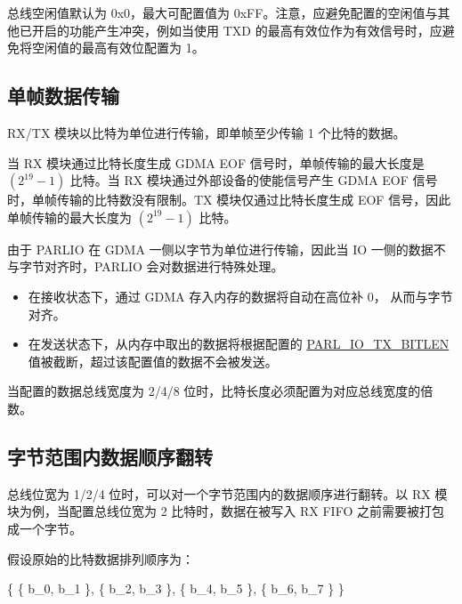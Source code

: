 \documentclass[main\_\_CN.tex]{subfiles}
\begin{document}
总线空闲值默认为 0x0，最大可配置值为 0xFF。注意，应避免配置的空闲值与其他已开启的功能产生冲突，例如当使用 TXD 的最高有效位作为有效信号时，应避免将空闲值的最高有效位配置为 1。

\subsection{单帧数据传输}

RX/TX 模块以比特为单位进行传输，即单帧至少传输 1 个比特的数据。

当 RX 模块通过比特长度生成 GDMA EOF 信号时，单帧传输的最大长度是 \begin{math} (2^{19}-1) \end{math} 比特。当 RX 模块通过外部设备的使能信号产生 GDMA EOF 信号时，单帧传输的比特数没有限制。TX 模块仅通过比特长度生成 EOF 信号，因此单帧传输的最大长度为 \begin{math} (2^{19}-1) \end{math} 比特。

由于 PARLIO 在 GDMA 一侧以字节为单位进行传输，因此当 IO 一侧的数据不与字节对齐时，PARLIO 会对数据进行特殊处理。

\begin{itemize}
    \item 在接收状态下，通过 GDMA 存入内存的数据将自动在高位补 0， 从而与字节对齐。\\
    \item 在发送状态下，从内存中取出的数据将根据配置的 \hyperref[fielddesc:PARLIOTXBITLEN]{PARL\_IO\_TX\_BITLEN} 值被截断，超过该配置值的数据不会被发送。\\
\end{itemize}

当配置的数据总线宽度为 2/4/8 位时，比特长度必须配置为对应总线宽度的倍数。


\subsection{字节范围内数据顺序翻转}

总线位宽为 1/2/4 位时，可以对一个字节范围内的数据顺序进行翻转。以 RX 模块为例，当配置总线位宽为 2 比特时，数据在被写入 RX FIFO 之前需要被打包成一个字节。

假设原始的比特数据排列顺序为：

\begin{center}
\{ \{ b\_{0}, b\_{1} \}, \{ b\_{2}, b\_{3} \}, \{ b\_{4}, b\_{5} \}, \{ b\_{6}, b\_{7} \} \}
\end{center}
\end{document}
